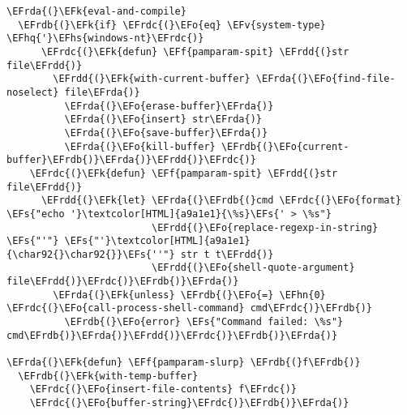 \documentclass[a4wide,10pt]{article}
\newcommand{\EFs}[1]{\textcolor{EFs}{#1}} %
\newcommand{\EFk}[1]{\textcolor{EFk}{#1}} %
\newcommand{\EFf}[1]{\textcolor{EFf}{#1}} %
\newcommand{\EFv}[1]{\textcolor{EFv}{#1}} %
\newcommand{\EFo}[1]{\textcolor{EFo}{#1}} %
\newcommand{\EFhn}[1]{\textcolor{EFhn}{\textbf{#1}}} %
\newcommand{\EFhq}[1]{\textcolor{EFhq}{#1}} %
\newcommand{\EFhs}[1]{\textcolor{EFhs}{#1}} %
\newcommand{\EFrda}[1]{\textcolor{EFrda}{#1}} %
\newcommand{\EFrdb}[1]{\textcolor{EFrdb}{#1}} %
\newcommand{\EFrdc}[1]{\textcolor{EFrdc}{#1}} %
\newcommand{\EFrdd}[1]{\textcolor{EFrdd}{#1}} %
\begin{document}
\begin{Code}
\begin{Verbatim}
\EFrda{(}\EFk{eval-and-compile}
  \EFrdb{(}\EFk{if} \EFrdc{(}\EFo{eq} \EFv{system-type} \EFhq{'}\EFhs{windows-nt}\EFrdc{)}
      \EFrdc{(}\EFk{defun} \EFf{pamparam-spit} \EFrdd{(}str file\EFrdd{)}
        \EFrdd{(}\EFk{with-current-buffer} \EFrda{(}\EFo{find-file-noselect} file\EFrda{)}
          \EFrda{(}\EFo{erase-buffer}\EFrda{)}
          \EFrda{(}\EFo{insert} str\EFrda{)}
          \EFrda{(}\EFo{save-buffer}\EFrda{)}
          \EFrda{(}\EFo{kill-buffer} \EFrdb{(}\EFo{current-buffer}\EFrdb{)}\EFrda{)}\EFrdd{)}\EFrdc{)}
    \EFrdc{(}\EFk{defun} \EFf{pamparam-spit} \EFrdd{(}str file\EFrdd{)}
      \EFrdd{(}\EFk{let} \EFrda{(}\EFrdb{(}cmd \EFrdc{(}\EFo{format} \EFs{"echo '}\textcolor[HTML]{a9a1e1}{\%s}\EFs{' > \%s"}
                         \EFrdd{(}\EFo{replace-regexp-in-string} \EFs{"'"} \EFs{"'}\textcolor[HTML]{a9a1e1}{\char92{}\char92{}}\EFs{''"} str t t\EFrdd{)}
                         \EFrdd{(}\EFo{shell-quote-argument} file\EFrdd{)}\EFrdc{)}\EFrdb{)}\EFrda{)}
        \EFrda{(}\EFk{unless} \EFrdb{(}\EFo{=} \EFhn{0} \EFrdc{(}\EFo{call-process-shell-command} cmd\EFrdc{)}\EFrdb{)}
          \EFrdb{(}\EFo{error} \EFs{"Command failed: \%s"} cmd\EFrdb{)}\EFrda{)}\EFrdd{)}\EFrdc{)}\EFrdb{)}\EFrda{)}

\EFrda{(}\EFk{defun} \EFf{pamparam-slurp} \EFrdb{(}f\EFrdb{)}
  \EFrdb{(}\EFk{with-temp-buffer}
    \EFrdc{(}\EFo{insert-file-contents} f\EFrdc{)}
    \EFrdc{(}\EFo{buffer-string}\EFrdc{)}\EFrdb{)}\EFrda{)}


\end{Verbatim}
\end{Code}
\end{document}
